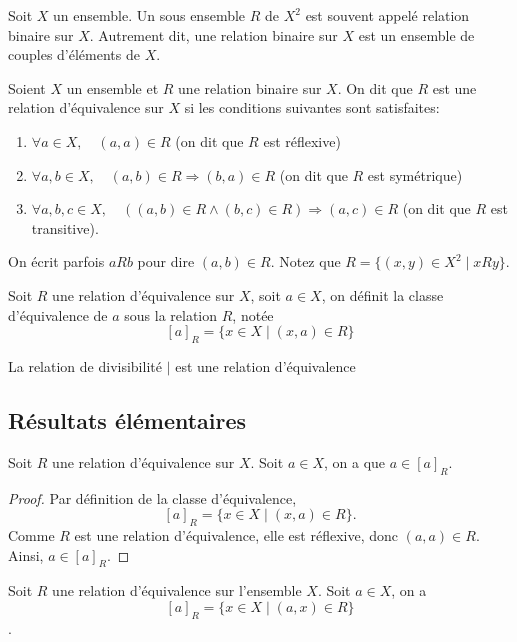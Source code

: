 Soit $X$ un ensemble. Un sous ensemble $R$ de $X^{2}$ est souvent appelé relation binaire sur $X$. Autrement dit, une relation binaire sur $X$ est un ensemble de couples d'éléments de $X$.

\begin{definition}
    Soient $X$ un ensemble et $R$ une relation binaire sur $X$. On dit que $R$ est une relation d'équivalence sur $X$ si les conditions suivantes sont satisfaites:
    \begin{enumerate}
        \item $\forall a \in X,\quad (a,a)\in R$ (on dit que $R$ est réflexive)
        \item $\forall a,b \in X,\quad (a,b)\in R \Rightarrow (b,a)\in R$ (on dit que $R$ est symétrique)
        \item $\forall a,b,c \in X, \quad ((a,b)\in R\land (b,c)\in R)\Rightarrow (a,c)\in R$ (on dit que $R$ est transitive).
    \end{enumerate}
    On écrit parfois $aRb$ pour dire $(a,b)\in R$. Notez que $R=\{(x,y)\in X^{2}\mid xRy\}$.
\end{definition}

\begin{definition}
    Soit $R$ une relation d'équivalence sur $X$, soit $a\in X$, on définit la classe d'équivalence de $a$ sous la relation $R$, notée \[[a]_R = \{x\in X \mid(x,a)\in R\}\]
\end{definition}

\begin{exemple}
    La relation de divisibilité $\mid$ est une relation d'équivalence
\end{exemple}

\subsection{Résultats élémentaires}


\begin{lemme}
    Soit $R$ une relation d'équivalence sur $X$. Soit $a\in X$, on a que $a\in[a]_R$.
\end{lemme}


\begin{proof}
    Par définition de la classe d'équivalence,
    \[
    [a]_R = \{x \in X \mid (x, a) \in R \}.
    \]
    Comme $R$ est une relation d'équivalence, elle est réflexive, donc $(a, a) \in R$. Ainsi, $a \in [a]_R$.
\end{proof}


\begin{lemme}
    Soit $R$ une relation d'équivalence sur l'ensemble $X$. Soit $a\in X$, on a 
    \[[a]_R=\{x\in X\mid (a,x)\in R\}\].
\end{lemme}


